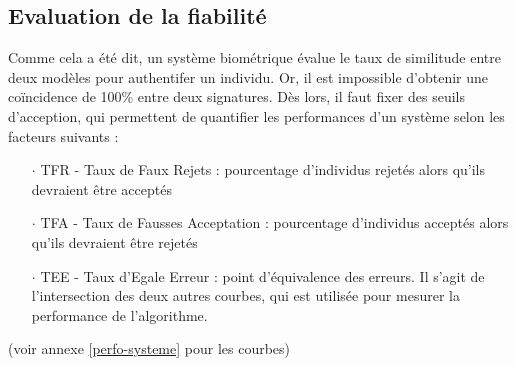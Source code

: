 \subsection{Evaluation de la fiabilité}
Comme cela a été dit, un système biométrique évalue le taux de similitude entre deux modèles pour authentifer un individu. Or, il est impossible d'obtenir une coïncidence de 100\% entre deux signatures. Dès lors, il faut fixer des seuils d'acception, qui permettent de quantifier les performances d'un système selon les facteurs suivants \cite{Xmisc_2}:
\begin{itemize}
\item[$\cdot$]\textsc{TFR} - Taux de Faux Rejets : pourcentage d'individus rejetés alors qu'ils devraient être acceptés
\item[$\cdot$]\textsc{TFA} - Taux de Fausses Acceptation : pourcentage d'individus acceptés alors qu'ils devraient être rejetés
\item[$\cdot$]\textsc{TEE} - Taux d'Egale Erreur : point d'équivalence des erreurs. Il s'agit de l'intersection des deux autres courbes, qui est utilisée pour mesurer la performance de l'algorithme.
\end{itemize}
 (voir annexe \ref{perfo-systeme} pour les courbes)